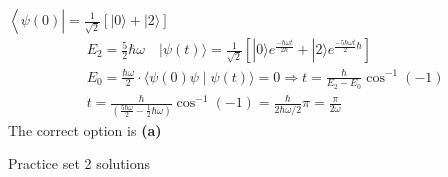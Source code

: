 \begin{enumerate}
\begin{answer}
	$\left\langle\psi ( 0 ) \left|=\frac{1}{\sqrt{2}}[|0\rangle+|2\rangle]\right.\right.$\\
	\begin{align*}
		&E_{2}=\frac{5}{2} \hbar \omega \quad|\psi(t)\rangle=\frac{1}{\sqrt{2}}\left[|0\rangle e^{\frac{-\hbar \omega t}{2 \hbar}}+|2\rangle e^{\frac{-5 \hbar \omega t}{2} \hbar}\right] \\
		&E_{0}=\frac{\hbar \omega}{2} \cdot\langle\psi(0) \psi \mid \psi(t)\rangle=0 \Rightarrow t=\frac{\hbar}{E_{2}-E_{0}} \cos ^{-1}(-1) \\
		&t=\frac{\hbar}{\left(\frac{5 \hbar \omega}{2}-\frac{1}{2} \hbar \omega\right)} \cos ^{-1}(-1)=\frac{\hbar}{2 \hbar \omega / 2} \pi=\frac{\pi}{2 \omega}
	\end{align*}
	The correct option is \textbf{(a)}
\end{answer}
\end{enumerate}
\newpage
\begin{abox}
	Practice set 2 solutions
	\end{abox}
